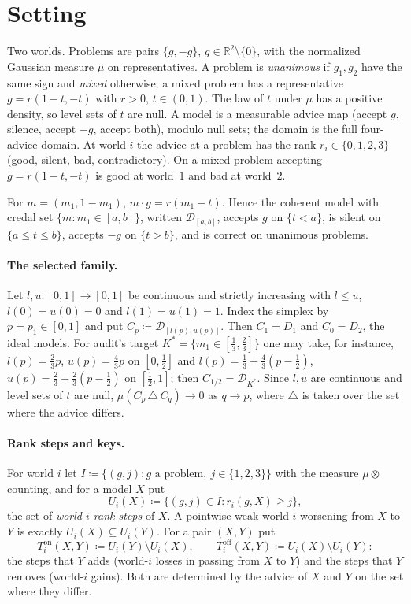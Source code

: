 \documentclass[11pt]{article}
\theoremstyle{definition}\newtheorem{definition}[theorem]{Definition}
\theoremstyle{remark}\newtheorem{remark}[theorem]{Remark}
\newcommand{\R}{\mathbb R}
\newcommand{\Dscr}{\mathcal D}
\newcommand{\on}{\mathrm{on}}
\newcommand{\off}{\mathrm{off}}
\begin{document}
\section{Setting}\label{sec:setting}

Two worlds. Problems are pairs $\{g,-g\}$, $g\in\R^2\setminus\{0\}$, with the
normalized Gaussian measure $\mu$ on representatives. A problem is
\emph{unanimous} if $g_1,g_2$ have the same sign and \emph{mixed} otherwise; a
mixed problem has a representative $g=r(1-t,-t)$ with $r>0$, $t\in(0,1)$. The
law of $t$ under $\mu$ has a positive density, so level sets of $t$ are null.
A model is a measurable advice map (accept $g$, silence, accept $-g$, accept
both), modulo null sets; the domain is the full four-advice domain. At world
$i$ the advice at a problem has the rank $r_i\in\{0,1,2,3\}$ (good, silent,
bad, contradictory). On a mixed problem accepting $g=r(1-t,-t)$ is good at
world~$1$ and bad at world~$2$.

For $m=(m_1,1-m_1)$, $m\cdot g=r(m_1-t)$. Hence the coherent model with credal
set $\{m:m_1\in[a,b]\}$, written $\Dscr_{[a,b]}$, accepts $g$ on $\{t<a\}$, is
silent on $\{a\le t\le b\}$, accepts $-g$ on $\{t>b\}$, and is correct on
unanimous problems.

\paragraph{The selected family.} Let $l,u\colon[0,1]\to[0,1]$ be continuous and
strictly increasing with $l\le u$, $l(0)=u(0)=0$ and $l(1)=u(1)=1$. Index the
simplex by $p=p_1\in[0,1]$ and put $C_p\coloneqq\Dscr_{[l(p),u(p)]}$. Then
$C_1=D_1$ and $C_0=D_2$, the ideal models. For audit's target
$K^*=\{m_1\in[\frac13,\frac23]\}$ one may take, for instance,
$l(p)=\frac23p$, $u(p)=\frac43p$ on $[0,\frac12]$ and
$l(p)=\frac13+\frac43(p-\frac12)$, $u(p)=\frac23+\frac23(p-\frac12)$ on
$[\frac12,1]$; then $C_{1/2}=\Dscr_{K^*}$. Since $l,u$ are continuous and level
sets of $t$ are null, $\mu(C_p\,\triangle\,C_q)\to0$ as $q\to p$, where
$\triangle$ is taken over the set where the advice differs.

\paragraph{Rank steps and keys.} For world $i$ let
$I\coloneqq\{(g,j):g\text{ a problem},\ j\in\{1,2,3\}\}$ with the measure
$\mu\otimes$counting, and for a model $X$ put
\[
 U_i(X)\coloneqq\{(g,j)\in I:r_i(g,X)\ge j\},
\]
the set of \emph{world-$i$ rank steps} of $X$. A pointwise weak world-$i$
worsening from $X$ to $Y$ is exactly $U_i(X)\subseteq U_i(Y)$. For a pair
$(X,Y)$ put
\[
 T^\on_i(X,Y)\coloneqq U_i(Y)\setminus U_i(X),\qquad
 T^\off_i(X,Y)\coloneqq U_i(X)\setminus U_i(Y):
\]
the steps that $Y$ adds (world-$i$ losses in passing from $X$ to $Y$) and the
steps that $Y$ removes (world-$i$ gains). Both are determined by the advice of
$X$ and $Y$ on the set where they differ.
\end{document}

